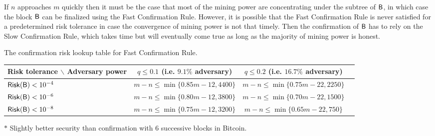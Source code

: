 If $n$ approaches $m$ quickly then it must be the case that most of the mining power are concentrating under the subtree of $\textsf{B}$,
in which case the block $\textsf{B}$ can be finalized using the Fast Confirmation Rule.
However, it is possible that the Fast Confirmation Rule is never satisfied for a predetermined risk tolerance in case the convergence of mining power is not that timely.
Then the confirmation of $\textsf{B}$ has to rely on the Slow Confirmation Rule,
which takes time but will eventually come true as long as the majority of mining power is honest.

\begin{center}
	\begin{threeparttable}
		\caption{The confirmation risk lookup table for Fast Confirmation Rule.}
		\smallskip
		\begin{tabular}{l|ccc}
			\toprule
			Risk tolerance $\backslash$  Adversary power &  
			$q\le 0.1$ (i.e. $9.1\%$ adversary) & $q\le 0.2$ (i.e. $16.7\%$ adversary) \\
			\midrule
			$\mathsf{Risk}(\textsf{B})<10^{-4}$ & $m-n\le \min\{0.85m-12,4400\}$\tnote{$\ast$} & $m-n\le \min\{0.75m-22,2250\}$ \\
			$\mathsf{Risk}(\textsf{B})<10^{-6}$ & $m-n\le \min\{0.80m-12,3800\}$ & $m-n\le \min\{0.70m-22,1500\}$ \\
			$\mathsf{Risk}(\textsf{B})<10^{-8}$ & $m-n\le \min\{0.75m-12,3200\}$  & $m-n\le \min\{0.65m-22,750\}$ \\
			\bottomrule
		\end{tabular}
		\begin{tablenotes}
			\item[$\ast$] Slightly better security than confirmation with $6$ successive blocks in Bitcoin.

		\end{tablenotes}
	\end{threeparttable}
\end{center}

